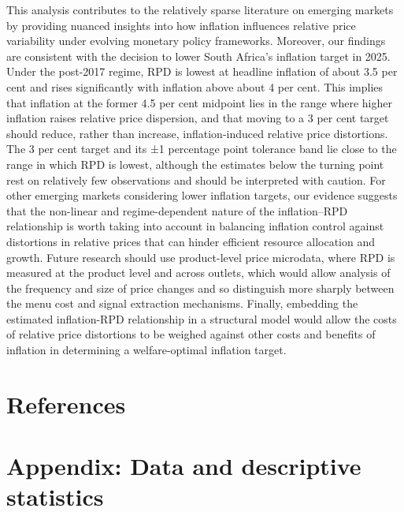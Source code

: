 \documentclass[
  letterpaper,
  DIV=11,
  numbers=noendperiod]{scrartcl}
\begin{document}
This analysis contributes to the relatively sparse literature on
emerging markets by providing nuanced insights into how inflation
influences relative price variability under evolving monetary policy
frameworks. Moreover, our findings are consistent with the decision to
lower South Africa's inflation target in 2025. Under the post-2017
regime, RPD is lowest at headline inflation of about 3.5 per cent and
rises significantly with inflation above about 4 per cent. This implies
that inflation at the former 4.5 per cent midpoint lies in the range
where higher inflation raises relative price dispersion, and that moving
to a 3 per cent target should reduce, rather than increase,
inflation-induced relative price distortions. The 3 per cent target and
its ±1 percentage point tolerance band lie close to the range in which
RPD is lowest, although the estimates below the turning point rest on
relatively few observations and should be interpreted with caution. For
other emerging markets considering lower inflation targets, our evidence
suggests that the non-linear and regime-dependent nature of the
inflation--RPD relationship is worth taking into account in balancing
inflation control against distortions in relative prices that can hinder
efficient resource allocation and growth. Future research should use
product-level price microdata, where RPD is measured at the product
level and across outlets, which would allow analysis of the frequency
and size of price changes and so distinguish more sharply between the
menu cost and signal extraction mechanisms. Finally, embedding the
estimated inflation-RPD relationship in a structural model would allow
the costs of relative price distortions to be weighed against other
costs and benefits of inflation in determining a welfare-optimal
inflation target.

\newpage

\section*{References}\label{references}

\renewcommand{\bibsection}{}


\setcounter{section}{0}
\renewcommand{\thesection}{\Alph{section}}
\setcounter{table}{0}
\renewcommand{\thetable}{A\arabic{table}}
\setcounter{figure}{0}
\renewcommand{\thefigure}{A\arabic{figure}}
\newpage

\section{Appendix: Data and descriptive
statistics}\label{appendix-data-and-descriptive-statistics}
\end{document}
